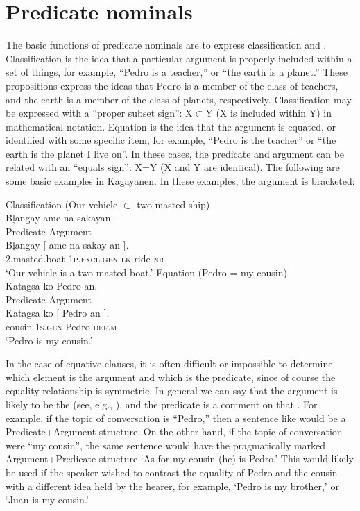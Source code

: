 \section{Predicate nominals}
\label{bkm:Ref428962397}\label{sec:predicatenominals}
The basic functions of predicate nominals are to express classification   and . Classification is the idea that a particular argument is properly included within a set of things, for example, “Pedro is a teacher,” or “the earth is a planet.” These propositions express the ideas that Pedro is a member of the class of teachers, and the earth is a member of the class of planets, respectively. Classification may be expressed with a “proper subset sign”: X${\subset}$Y (X is included within Y) in mathematical notation. Equation is the idea that the argument is equated, or identified with some specific item, for example, “Pedro is the teacher” or “the earth is the planet I live on”. In these cases, the predicate and argument can be related with an “equals sign”: X=Y (X and Y are identical). The following are some basic examples in Kagayanen. In these examples, the argument is bracketed:

\ea
Classification (Our vehicle ${\subset}$ two masted ship)  \\
Bļangay  ame  na  sakayan. \\\smallskip
Predicate\hspace{.8cm}  Argument \\
\gll Bļangay [ ame  na  sakay-an ]. \\
2.masted.boat  {} 1\textsc{p.excl.gen}  \textsc{lk}  ride\textsc{-nr} \\
\glt ‘Our vehicle is a two masted boat.’
\z
\ea
\label{bkm:Ref442630001}
Equation (Pedro = my cousin) \\
Katagsa  ko  Pedro  an. \\\smallskip
Predicate\hspace{.8cm}  Argument \\ 
\gll Katagsa  ko [ Pedro  an{ }]. \\
cousin  1\textsc{s.gen} {} Pedro  \textsc{def.m} \\
\glt ‘Pedro is my cousin.’
\z

In the case of equative clauses, it is often difficult or impossible to determine which element is the argument and which is the predicate, since of course the equality relationship is symmetric. In general we can say that the argument is likely to be the  (see, e.g., \citealt{givon2001-2}), and the predicate is a comment on that . For example, if the topic of conversation is “Pedro,” then a sentence like  would be a Predicate+Argument structure. On the other hand, if the topic of conversation were “my cousin”, the same sentence would have the pragmatically marked Argument+Predicate structure ‘As for my cousin (he) is Pedro.’  This would likely be used if the speaker wished to contrast the equality of Pedro and the cousin with a different idea held by the hearer, for example, ‘Pedro is my brother,’ or ‘Juan is my cousin.’

